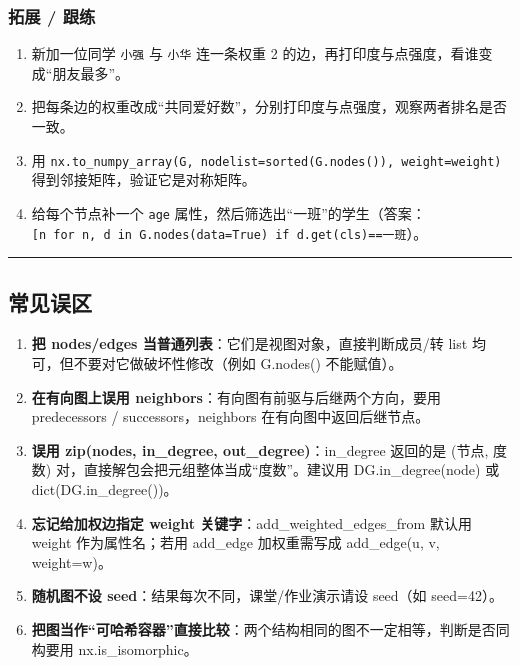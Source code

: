\subsubsection{拓展 / 跟练}\label{ux62d3ux5c55-ux8ddfux7ec3-12}

\begin{enumerate}
\def\labelenumi{\arabic{enumi}.}
\tightlist
\item
  新加一位同学 \texttt{小强} 与 \texttt{小华} 连一条权重 2
  的边，再打印度与点强度，看谁变成``朋友最多''。
\item
  把每条边的权重改成``共同爱好数''，分别打印度与点强度，观察两者排名是否一致。
\item
  用
  \texttt{nx.to\_numpy\_array(G,\ nodelist=sorted(G.nodes()),\ weight=\textquotesingle{}weight\textquotesingle{})}
  得到邻接矩阵，验证它是对称矩阵。
\item
  给每个节点补一个 \texttt{age}
  属性，然后筛选出``一班''的学生（答案：\texttt{{[}n\ for\ n,\ d\ in\ G.nodes(data=True)\ if\ d.get(\textquotesingle{}cls\textquotesingle{})==\textquotesingle{}一班\textquotesingle{}{]}}）。
\end{enumerate}

\begin{center}\rule{0.5\linewidth}{0.5pt}\end{center}

\subsection{常见误区}\label{ux5e38ux89c1ux8befux533a-17}

\begin{enumerate}
\def\labelenumi{\arabic{enumi}.}
\tightlist
\item
  \textbf{把 nodes/edges 当普通列表}：它们是视图对象，直接判断成员/转
  list 均可，但不要对它做破坏性修改（例如 G.nodes() 不能赋值）。
\item
  \textbf{在有向图上误用 neighbors}：有向图有前驱与后继两个方向，要用
  predecessors / successors，neighbors 在有向图中返回后继节点。
\item
  \textbf{误用 zip(nodes, in\_degree, out\_degree)}：in\_degree 返回的是
  (节点, 度数) 对，直接解包会把元组整体当成``度数''。建议用
  DG.in\_degree(node) 或 dict(DG.in\_degree())。
\item
  \textbf{忘记给加权边指定 weight 关键字}：add\_weighted\_edges\_from
  默认用 weight 作为属性名；若用 add\_edge 加权重需写成 add\_edge(u, v,
  weight=w)。
\item
  \textbf{随机图不设 seed}：结果每次不同，课堂/作业演示请设 seed（如
  seed=42）。
\item
  \textbf{把图当作``可哈希容器''直接比较}：两个结构相同的图不一定相等，判断是否同构要用
  nx.is\_isomorphic。
\end{enumerate}

